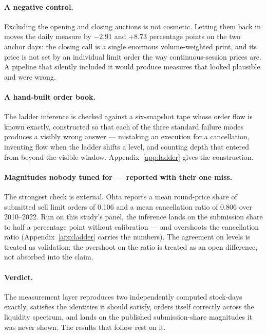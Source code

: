 \paragraph{A negative control.}
Excluding the opening and closing auctions is not cosmetic. Letting them back in
moves the daily measure by $-2.91$ and $+8.73$ percentage points on the two
anchor days: the closing call is a single enormous volume-weighted print, and its
price is not set by an individual limit order the way continuous-session prices
are. A pipeline that silently included it would produce measures that looked
plausible and were wrong.

\paragraph{A hand-built order book.}
The ladder inference is checked against a six-snapshot tape whose order flow is
known exactly, constructed so that each of the three standard failure modes
produces a visibly wrong answer --- mistaking an execution for a cancellation,
inventing flow when the ladder shifts a level, and counting depth that entered
from beyond the visible window. Appendix~\ref{app:ladder} gives the construction.

\paragraph{Magnitudes nobody tuned for --- reported with their one miss.}
The strongest check is external. Ohta reports a mean round-price share of
submitted sell limit orders of 0.106 and a mean cancellation ratio of 0.806
over 2010--2022. Run on this study's panel, the inference lands on the
submission share to half a percentage point without calibration --- and
overshoots the cancellation ratio (Appendix~\ref{app:ladder} carries the
numbers). The agreement on levels is treated as validation; the overshoot on
the ratio is treated as an open difference, not absorbed into the claim.

\paragraph{Verdict.}
The measurement layer reproduces two independently computed stock-days exactly,
satisfies the identities it should satisfy, orders itself correctly across the
liquidity spectrum, and lands on the published submission-share magnitudes it
was never shown. The results that follow rest on it.
